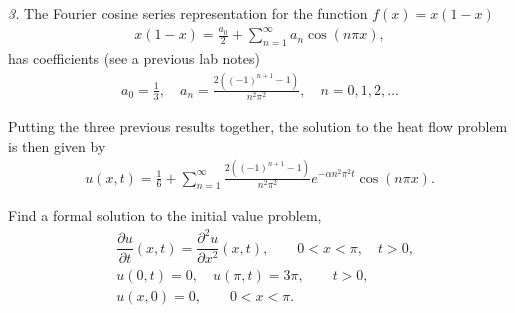 \documentclass[11pt]{article}
\begin{document}
\begin{solution}
\textsl{3. } The Fourier cosine series representation for the function $f(x)=x(1-x)$ 
\begin{eqnarray*}
x(1-x) = \frac{a_{0}}{2}+\sum_{n=1}^{\infty} a_{n} \cos(n\pi x),
\end{eqnarray*}
has coefficients (see a previous lab notes)
\begin{eqnarray*}
\boxed{a_{0} = \frac{1}{3}, \quad a_{n} = \frac{2((-1)^{n+1}-1)}{n^{2}\pi^{2}}}, \quad n = 0,1,2,\dots
\end{eqnarray*}

Putting the three previous results together, the solution to the heat flow problem is then given by
\begin{eqnarray*}
\boxed{u(x,t) = \frac{1}{6} + \sum_{n=1}^{\infty}\frac{2((-1)^{n+1}-1)}{n^{2}\pi^{2}}e^{-\alpha n^{2}\pi^{2}t}\cos (n\pi x)}.
\end{eqnarray*}


\end{solution}





\begin{problem}
Find a formal solution to the initial value problem,
\begin{equation*} \begin{split}
& \dfrac{\partial u }{\partial t } (x,t) = \dfrac{\partial^2 u}{\partial x^2}(x,t), \qquad 0<x<\pi, \quad t>0, \\
& u(0,t) = 0, \quad u(\pi,t)= 3\pi, \qquad t>0, \\
& u(x,0) = 0, \qquad 0<x<\pi.
\end{split}\end{equation*}
\end{problem}
\end{document}
